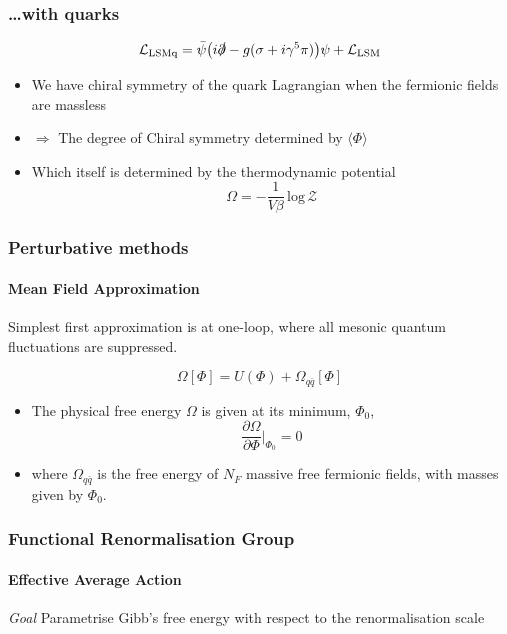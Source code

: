 \documentclass[10pt,a4paper,usenames,dvipsnames]{beamer}
\begin{document}
\begin{frame}
  \frametitle{\dots with quarks}

  \begin{block}{}
    \begin{equation*}
      \mathcal{L}_{\text{LSMq}} = \bar{\psi}\big(i\slashed{\partial} - g(\sigma + i\gamma^5\pi) \big)\psi +
      \mathcal{L}_{\text{LSM}}
    \end{equation*}
  \end{block}

  \begin{itemize}
    \item We have chiral symmetry of the quark Lagrangian when the fermionic fields are massless
    \item $\Rightarrow$ The degree of Chiral symmetry determined by $\langle \Phi \rangle$
    \item Which itself is determined by the thermodynamic potential 
  \[
    \Omega = -\frac{1}{V\beta} \, \text{log}\,\mathcal{Z}
  \]
  \end{itemize}
\end{frame}

\begin{frame}
  \frametitle{Perturbative methods}
  \framesubtitle{Mean Field Approximation}

  Simplest first approximation is at one-loop, where all mesonic quantum fluctuations are suppressed.

  \begin{block}{}
    \begin{equation*}
      \Omega[\Phi] = U(\Phi) + \Omega_{q\bar{q}}[\Phi]
    \end{equation*}
  \end{block}

  \begin{itemize}
    \item The physical free energy $\Omega$ is given at its minimum, $\Phi_0$, 
      \begin{equation*}
        \frac{\partial\Omega}{\partial\Phi} \Big|_{\Phi_0} = 0
      \end{equation*}
    \item where $\Omega_{q\bar{q}}$ is the free energy of $N_F$ massive free fermionic fields, with masses given by $\Phi_0$.
  \end{itemize}

\end{frame}

\begin{frame}
  \frametitle{Functional Renormalisation Group}
  \framesubtitle{Effective Average Action}

  \begin{alertblock}{\itshape Goal}
    Parametrise Gibb's free energy with respect to the renormalisation scale
  \end{alertblock}
\end{frame}
\end{document}
